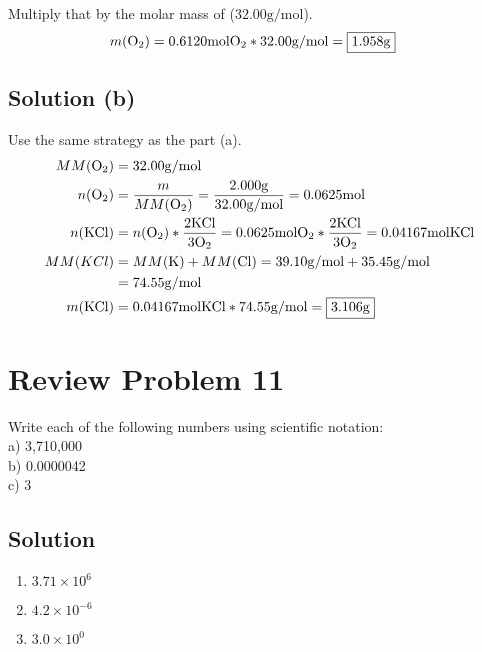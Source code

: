 \documentclass[10pt]{article}
\begin{document}
            Multiply that by the molar mass of  ($32.00 \unit{\gram/\mol}$).
            \begin{align}
                m(\ce{O2})  &=  0.6120 \unit{\mole} \ce{O2} * 32.00 \unit{\gram/\mol}
                    =   \boxed{1.958 \unit{\gram}}
            \end{align}

        \subsection{Solution (b)}
            Use the same strategy as the part (a).
            \begin{align}
                MM(\ce{O2}) &=  32.00 \unit{\gram/\mole}\\
                n(\ce{O2})  &=  \frac{m}{MM(\ce{O2})}
                    =   \frac{2.000 \unit{\gram}}{32.00 \unit{\gram/\mole}}
                    =   0.0625 \unit{\mole}\\
                n(\ce{KCl}) &=  n(\ce{O2}) * \frac{2 \ce{KCl}}{3 \ce{O2}}
                    =   0.0625 \unit{\mole} \ce{O2} * \frac{2 \ce{KCl}}{3\ce{O2}}
                    =   0.04167 \unit{\mole} \ce{KCl}\\
                MM(KCl) &=  MM(\ce{K}) + MM(\ce{Cl})
                    =   39.10 \unit{\gram/\mole} + 35.45 \unit{\gram/\mole}\\
                    &=  74.55 \unit{\gram/\mole}\\
                m(\ce{KCl}) &=  0.04167 \unit{\mole} \ce{KCl} * 74.55 \unit{\gram/\mole}
                    =   \boxed{3.106 \unit{\gram}}
            \end{align}

    \pagebreak
    \section{Review Problem 11}
        Write each of the following numbers using scientific notation:\\
        a) 3,710,000 \\
        b) 0.0000042 \\
        c) 3
        \subsection{Solution}
            \begin{enumerate}[label=\alph*)]
                \item $3.71 \times 10^6$
                \item $4.2 \times 10^{-6}$
                \item $3.0 \times 10^0$
            \end{enumerate}
\end{document}
